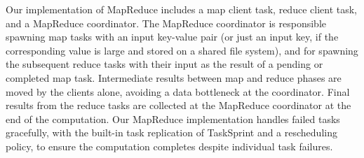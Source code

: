 \documentclass [11pt, twocolumn] {article}
\begin{document}
Our implementation of MapReduce includes a map client task, reduce client task, and a MapReduce coordinator. The MapReduce coordinator is responsible spawning map tasks with an input key-value pair (or just an input key, if the corresponding value is large and stored on a shared file system), and for spawning the subsequent reduce tasks with their input as the result of a pending or completed map task. Intermediate results between map and reduce phases are moved by the clients alone, avoiding a data bottleneck at the coordinator. Final results from the reduce tasks are collected at the MapReduce coordinator at the end of the computation. Our MapReduce implementation handles failed tasks gracefully, with the built-in task replication of TaskSprint and a rescheduling policy, to ensure the computation completes despite individual task failures.
\end{document}

